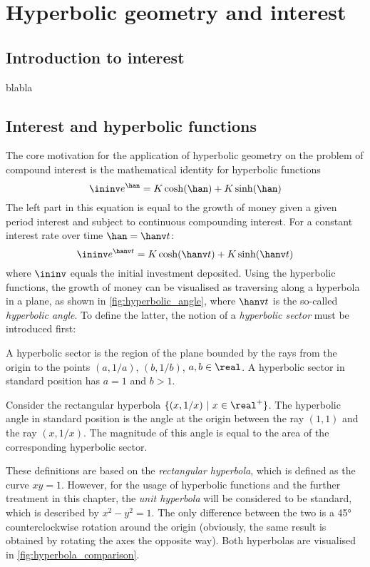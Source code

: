 \chapter{Hyperbolic geometry and interest}

\section{Introduction to interest}
blabla

\section{Interest and hyperbolic functions}
The core motivation for the application of hyperbolic geometry on the problem of compound interest is the mathematical identity for hyperbolic functions
\begin{equation}
    \ininv e^{\han} = K\cosh(\han) + K\sinh(\han)
    \label{eq:sinhcosh}
\end{equation}
The left part in this equation is equal to the growth of money given a given period interest \han and subject to continuous compounding interest. For a constant interest rate over time \(\han = \hanv t\):
\begin{equation}
    \ininv e^{\hanv t} = K\cosh(\hanv t) + K\sinh(\hanv t)
\end{equation}
where \(\ininv\) equals the initial investment deposited. Using the hyperbolic functions, the growth of money can be visualised as traversing along a hyperbola in a plane, as shown in \cref{fig:hyperbolic_angle}, where \(\hanv t\) is the so-called \textit{hyperbolic angle}. To define the latter, the notion of a \textit{hyperbolic sector} must be introduced first:

\begin{definition}
    A hyperbolic sector is the region of the plane bounded by the rays from the origin to the points \((a, 1/a)\), \((b, 1/b)\), \(a, b \in \real\). A hyperbolic sector in standard position has \(a = 1\) and \(b > 1\). 
    
\end{definition}

\begin{definition}
    Consider the rectangular hyperbola \(\{(x, 1/x)\ \vert\ x \in \real^+\}\). The hyperbolic angle in standard position is the angle at the origin between the ray \((1, 1)\) and the ray \((x, 1/x)\). The magnitude of this angle is equal to the area of the corresponding hyperbolic sector.
\end{definition}
These definitions are based on the \textit{rectangular hyperbola}, which is defined as the curve \(xy = 1\). However, for the usage of hyperbolic functions and the further treatment in this chapter, the \textit{unit hyperbola} will be considered to be standard, which is described by \(x^2 - y^2 = 1\). The only difference between the two is a \ang{45} counterclockwise rotation around the origin (obviously, the same result is obtained by rotating the axes the opposite way). Both hyperbolas are visualised in \cref{fig:hyperbola_comparison}.


